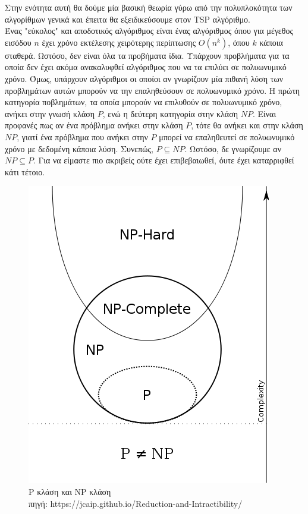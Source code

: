 \documentclass[oneside,12pt]{book}
\newenvironment{matlab}
	{\begin{figure}[hp]\centering\captionsetup{justification=centering}}
	{\end{figure}}
\theoremstyle{definition}
\begin{document}
Στην ενότητα αυτή θα δούμε μία βασική θεωρία γύρω από την πολυπλοκότητα των αλγορίθμων γενικά και έπειτα θα εξειδικεύσουμε στον TSP αλγόριθμο. \\

Ένας "εύκολος" και αποδοτικός αλγόριθμος είναι ένας αλγόριθμος όπου για μέγεθος εισόδου \(n\) έχει χρόνο εκτέλεσης χειρότερης περίπτωσης \(Ο(n^k)\), όπου \(k\) κάποια σταθερά. Ωστόσο, δεν είναι όλα τα προβήματα ίδια. Υπάρχουν προβλήματα για τα οποία δεν έχει ακόμα ανακαλυφθεί αλγόριθμος που να τα επιλύει σε πολυωνυμικό χρόνο. Όμως, υπάρχουν αλγόριθμοι οι οποίοι αν γνωρίζουν μία πιθανή λύση των προβλημάτων αυτών μπορούν να την επαληθεύσουν σε πολυωνυμικό χρόνο. Η πρώτη κατηγορία ποβλημάτων, τα οποία μπορούν να επιλυθούν σε πολυωνυμικό χρόνο, ανήκει στην γνωσή κλάση \(P\), ενώ η δεύτερη κατηγορία στην κλάση \(NP\). Είναι προφανές πως αν ένα πρόβλημα ανήκει στην κλάση \(P\), τότε θα ανήκει και στην κλάση \(NP\), γιατί ένα πρόβλημα που ανήκει στην \(P\) μπορεί να επαληθευτεί σε πολυωνυμικό χρόνο με δεδομένη κάποια λύση. Συνεπώς, \(P \subseteq NP\). Ωστόσο, δε γνωρίζουμε αν \(NP \subseteq P\). Για να είμαστε πιο ακριβείς ούτε έχει επιβεβαιωθεί, όυτε έχει καταρριφθεί κάτι τέτοιο. \\

\begin{matlab}
	\includegraphics[scale=0.5]{images/complexity_classes.png}
	\caption{P κλάση και NP κλάση \\ πηγή: https://jcaip.github.io/Reduction-and-Intractibility/}
\end{matlab}
\end{document}
